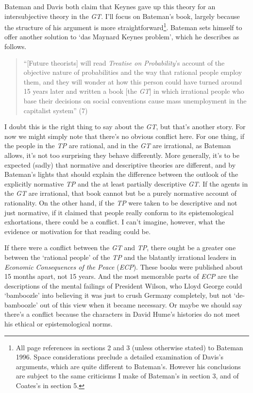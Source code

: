 \documentclass[
  11pt,
  letterpaper,
  DIV=11,
  numbers=noendperiod,
  twoside]{scrartcl}
\begin{document}
Bateman and Davis both claim that Keynes gave up this theory for an
intersubjective theory in the \emph{GT}. I'll focus on Bateman's book,
largely because the structure of his argument is more
straightforward\footnote{All page references in sections 2 and 3 (unless
  otherwise stated) to Bateman 1996. Space considerations preclude a
  detailed examination of Davis's arguments, which are quite different
  to Bateman's. However his conclusions are subject to the same
  criticisms I make of Bateman's in section 3, and of Coates's in
  section 5.}. Bateman sets himself to offer another solution to `das
Maynard Keynes problem', which he describes as follows.

\begin{quote}
``{[}Future theorists{]} will read \emph{Treatise on Probability}'s
account of the objective nature of probabilities and the way that
rational people employ them, and they will wonder at how this person
could have turned around 15 years later and written a book {[}the
\emph{GT}{]} in which irrational people who base their decisions on
social conventions cause mass unemployment in the capitalist system''
(7)
\end{quote}

I doubt this is the right thing to say about the \emph{GT}, but that's
another story. For now we might simply note that there's no obvious
conflict here. For one thing, if the people in the \emph{TP} are
rational, and in the \emph{GT} are irrational, as Bateman allows, it's
not too surprising they behave differently. More generally, it's to be
expected (sadly) that normative and descriptive theories are different,
and by Bateman's lights that should explain the difference between the
outlook of the explicitly normative \emph{TP} and the at least partially
descriptive \emph{GT}. If the agents in the \emph{GT} are irrational,
that book cannot but be a purely normative account of rationality. On
the other hand, if the \emph{TP} were taken to be descriptive and not
just normative, if it claimed that people really conform to its
epistemological exhortations, there could be a conflict. I can't
imagine, however, what the evidence or motivation for that reading could
be.

If there were a conflict between the \emph{GT} and \emph{TP}, there
ought be a greater one between the `rational people' of the \emph{TP}
and the blatantly irrational leaders in \emph{Economic Consequences of
the Peace} (\emph{ECP}). These books were published about 15 months
apart, not 15 years. And the most memorable parts of \emph{ECP} are the
descriptions of the mental failings of President Wilson, who Lloyd
George could `bamboozle' into believing it was just to crush Germany
completely, but not `de-bamboozle' out of this view when it became
necessary. Or maybe we should say there's a conflict because the
characters in David Hume's histories do not meet his ethical or
epistemological norms.
\end{document}
